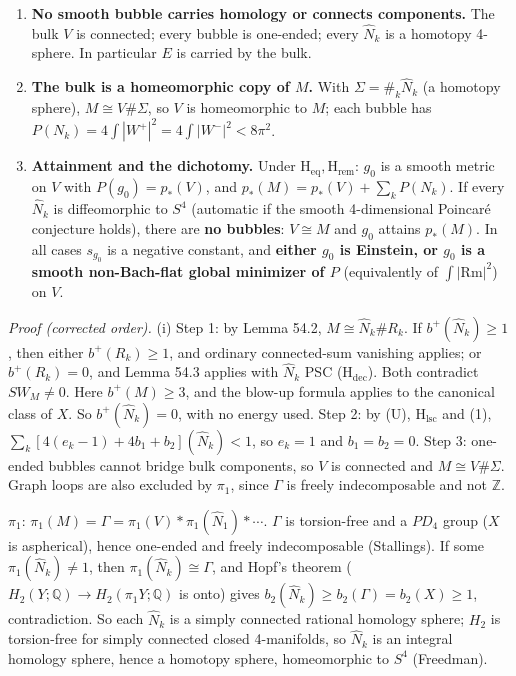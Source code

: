 \documentclass[
  10pt,
]{report}
\begin{document}
\begin{enumerate}
\def\labelenumi{(\roman{enumi})}
\item
  \textbf{No smooth bubble carries homology or connects components.} The
  bulk \(V\) is connected; every bubble is one-ended; every
  \(\widehat N_k\) is a homotopy 4-sphere. In particular \(E\) is
  carried by the bulk.
\item
  \textbf{The bulk is a homeomorphic copy of \(M\).} With
  \(\Sigma=\#_k\widehat N_k\) (a homotopy sphere), \(M\cong V\#\Sigma\),
  so \(V\) is homeomorphic to \(M\); each bubble has
  \(P(N_k)=4\int|W^+|^2=4\int|W^-|^2<8\pi^2\).
\item
  \textbf{Attainment and the dichotomy.} Under
  \(\mathrm{H_{eq}},\mathrm{H_{rem}}\): \(g_0\) is a smooth metric on
  \(V\) with \(P(g_0)=p_*(V)\), and \(p_*(M)=p_*(V)+\sum_kP(N_k)\). If
  every \(\widehat N_k\) is diffeomorphic to \(S^4\) (automatic if the
  smooth 4-dimensional Poincaré conjecture holds), there are \textbf{no
  bubbles}: \(V\cong M\) and \(g_0\) attains \(p_*(M)\). In all cases
  \(s_{g_0}\) is a negative constant, and \textbf{either \(g_0\) is
  Einstein, or \(g_0\) is a smooth non-Bach-flat global minimizer of
  \(P\)} (equivalently of \(\int|\mathrm{Rm}|^2\)) on \(V\).
\end{enumerate}

\emph{Proof (corrected order).} (i) Step 1: by Lemma 54.2,
\(M\cong\widehat N_k\#R_k\). If \(b^+(\widehat N_k)\ge1\), then either
\(b^+(R_k)\ge1\), and ordinary connected-sum vanishing applies; or
\(b^+(R_k)=0\), and Lemma 54.3 applies with \(\widehat N_k\) PSC
(\(\mathrm{H_{dec}}\)). Both contradict \(SW_M\ne0\). Here
\(b^+(M)\ge3\), and the blow-up formula applies to the canonical class
of \(X\). So \(b^+(\widehat N_k)=0\), with no energy used. Step 2: by
(U), \(\mathrm{H_{lsc}}\) and (1),
\(\sum_k[4(e_k-1)+4b_1+b_2](\widehat N_k)<1\), so \(e_k=1\) and
\(b_1=b_2=0\). Step 3: one-ended bubbles cannot bridge bulk components,
so \(V\) is connected and \(M\cong V\#\Sigma\). Graph loops are also
excluded by \(\pi_1\), since \(\Gamma\) is freely indecomposable and not
\(\mathbb Z\).

\(\pi_1\): \(\pi_1(M)=\Gamma=\pi_1(V)*\pi_1(\widehat N_1)*\cdots\).
\(\Gamma\) is torsion-free and a \(PD_4\) group (\(X\) is aspherical),
hence one-ended and freely indecomposable (Stallings). If some
\(\pi_1(\widehat N_k)\neq1\), then \(\pi_1(\widehat N_k)\cong\Gamma\),
and Hopf's theorem (\(H_2(Y;\mathbb Q)\to H_2(\pi_1Y;\mathbb Q)\) is
onto) gives \(b_2(\widehat N_k)\ge b_2(\Gamma)=b_2(X)\ge1\),
contradiction. So each \(\widehat N_k\) is a simply connected rational
homology sphere; \(H_2\) is torsion-free for simply connected closed
4-manifolds, so \(\widehat N_k\) is an integral homology sphere, hence a
homotopy sphere, homeomorphic to \(S^4\) (Freedman).
\end{document}
